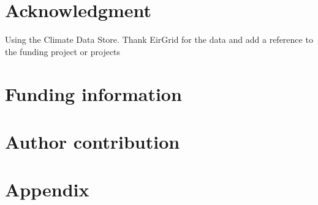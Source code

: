 \documentclass[a4paper, 11pt]{article}
\begin{document}
\newpage
\section{Acknowledgment}
Using the Climate Data Store. Thank EirGrid for the data and add a reference to the funding project or projects

\section{Funding information}

\section{Author contribution}



\newpage
\section*{Appendix}
\end{document}
